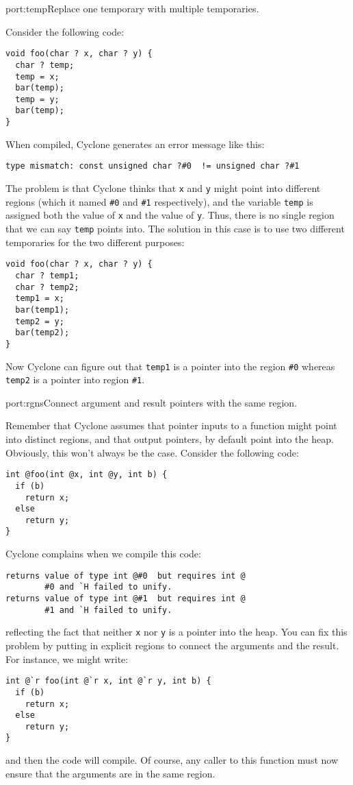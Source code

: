 \begin{porta}{port:temp}{Replace one temporary with multiple temporaries.}

Consider the following code:
\begin{verbatim}
void foo(char ? x, char ? y) {
  char ? temp;
  temp = x;
  bar(temp);
  temp = y;
  bar(temp);
}
\end{verbatim}
When compiled, Cyclone generates an error message like this:
\begin{verbatim}
type mismatch: const unsigned char ?#0  != unsigned char ?#1 
\end{verbatim}
The problem is that Cyclone thinks that \texttt{x} and \texttt{y}
might point into different regions (which it named \texttt{\#0} and
\texttt{\#1} respectively), and the variable \texttt{temp} is assigned
both the value of \texttt{x} and the value of \texttt{y}.  Thus,
there is no single region that we can say \texttt{temp} points into.
The solution in this case is to use two different temporaries for
the two different purposes:
\begin{verbatim}
void foo(char ? x, char ? y) {
  char ? temp1;
  char ? temp2;
  temp1 = x;
  bar(temp1);
  temp2 = y;
  bar(temp2);
}
\end{verbatim}
Now Cyclone can figure out that \texttt{temp1} is a pointer into
the region \texttt{\#0} whereas \texttt{temp2} is a pointer into
region \texttt{\#1}.  
\end{porta}

\begin{porta}{port:rgns}{Connect argument and result pointers with the same region.}

Remember that Cyclone assumes that pointer inputs to a function might
point into distinct regions, and that output pointers, by default point
into the heap.  Obviously, this won't always be the case.  Consider
the following code:
\begin{verbatim}
int @foo(int @x, int @y, int b) {
  if (b)
    return x;
  else
    return y;
}
\end{verbatim}
Cyclone complains when we compile this code:
\begin{verbatim}
returns value of type int @#0  but requires int @
        #0 and `H failed to unify. 
returns value of type int @#1  but requires int @
        #1 and `H failed to unify. 
\end{verbatim}
reflecting the fact that neither \texttt{x} nor \texttt{y} is a pointer
into the heap.  You can fix this problem by putting in explicit regions
to connect the arguments and the result.  For instance, we might write:
\begin{verbatim}
int @`r foo(int @`r x, int @`r y, int b) {
  if (b)
    return x;
  else
    return y;
}
\end{verbatim}
and then the code will compile.  Of course, any caller to this function
must now ensure that the arguments are in the same region.  
\end{porta}


